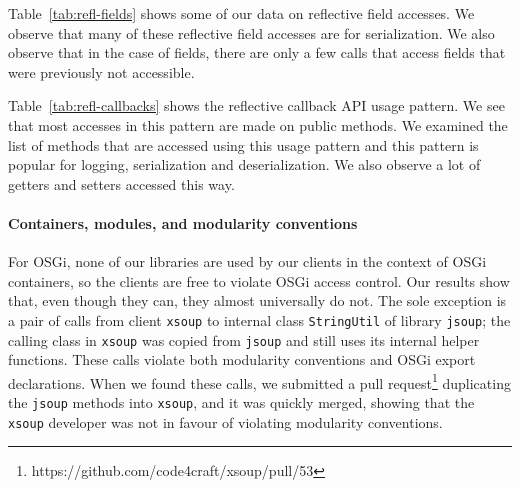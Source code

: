 Table~\ref{tab:refl-fields} shows some of our data on reflective field accesses. We observe that many of these reflective field accesses are for serialization. We also observe that in the case of fields, there are only a few calls that access fields that were previously not accessible.


Table~\ref{tab:refl-callbacks} shows the reflective callback API usage pattern. We see that most accesses in this pattern are made on public methods. We examined the list of methods that are accessed using this usage pattern and this pattern is popular for logging, serialization and deserialization. We also observe a lot of getters and setters accessed this way.



%








\paragraph{Containers, modules, and modularity conventions}
For OSGi, none of our libraries are used by our clients in the context of OSGi containers, so the clients are free to violate OSGi access control. Our results show that, even though they can, they almost universally do not. The sole exception is a pair of calls from client \texttt{xsoup} to internal class \texttt{StringUtil} of library \texttt{jsoup}; the calling class in \texttt{xsoup} was copied from \texttt{jsoup} and still uses its internal helper functions. These calls violate both modularity conventions and OSGi export declarations. When we found these calls, we submitted a pull request\footnote{https://github.com/code4craft/xsoup/pull/53} duplicating the \texttt{jsoup} methods into \texttt{xsoup}, and it was quickly merged, showing that the \texttt{xsoup} developer was not in favour of violating modularity conventions.

